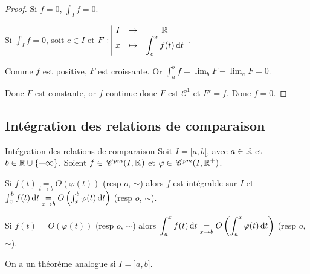 \begin{proof}
    Si $f = 0$, $\int_I f = 0$.

    Si $\int_{I } f = 0$, soit $c \in I$ et $F: \space \begin{array}{|ccc} \displaystyle I & \to & \displaystyle \mathbb{R} \\ \displaystyle x & \mapsto & \displaystyle \int_c^x f(t) \,\mathrm{d}t \end{array}$.

    Comme $f$ est positive, $F$ est croissante. Or $\int_{a }^{b } f = \lim_b F - \lim_a F = 0$. 

    Donc $F$ est constante, or $f$ continue donc $F$ est $\mathscr C^1$ et $F' = f$. Donc 
    $f = 0$.
\end{proof}


\subsection{Intégration des relations de comparaison}

\begin{theoreme}{Intégration des relations de comparaison}{}
    Soit $I = [a,b[$, avec $a \in \mathbb{R}$ et $b \in \mathbb{R} \cup \{+\infty\}$. 
    Soient $f \in \,\mathscr C^{pm} (I, \mathbb{K})$ et $\varphi \in \,\mathscr C^{pm}(I, \mathbb{R}^+)$.

    
    \svspace Si $f(t) \underset{t \to b }{=} O(\varphi(t))$ (resp $o$, $\sim$) alors $f$ est intégrable sur $I$ 
    et $\int_x^b f(t) \,\mathrm{d}t \underset{x \to b }{=} O\left( \int_x^b \varphi(t) \,\mathrm{d}t \right)$ (resp $o$, $\sim$).


    \svspace Si $f(t) = O(\varphi(t))$ (resp $o$, $\sim$) alors 
    $\displaystyle \int_{a }^{x } f(t) \,\mathrm{d}t \underset{x \to b }{=} O\left( \int_{a }^{x } \varphi(t) \,\mathrm{d}t \right)$ (resp $o$, $\sim$).
\end{theoreme}

\begin{remarque}
    On a un théorème analogue si $I = ]a, b]$. 
\end{remarque}

